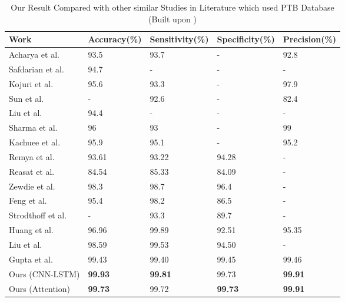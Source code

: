 \documentclass{ieeeaccess}
\begin{document}
\begin{table}[t]
    \centering%
    \caption{Our Result Compared with other similar Studies in Literature which used PTB Database (Built upon \cite{10.1007/978-3-030-64610-3_40})}
    \label{tbl:tbl3}
    \small
    \begin{tabular}{*{5}{p{}}}
          \toprule
    \textbf{Work} &\textbf{Accuracy(\%)} &  \textbf{Sensitivity(\%)} &\textbf{Specificity(\%)} &\textbf{Precision(\%)}
      \\\midrule
    Acharya et al. \cite{ACHARYA2017190} & 93.5 & 93.7 & - & 92.8\\
     Safdarian et al. \cite{safdarain} &94.7 & - & - & -\\
     Kojuri et al. \cite{kojuri}&95.6 & 93.3 & - & 97.9 \\
     Sun et al. \cite{sun} & - & 92.6 & - & 82.4\\
      Liu et al. \cite{Liu94}& 94.4 & - & - & -\\
      Sharma et al. \cite{Sharma2018InferiorMI}& 96 & 93 & - & 99\\
      Kachuee et al. \cite{8419425}& 95.9 & 95.1 & - & 95.2\\
      Remya et al. \cite{remya}& 93.61 & 93.22 & 94.28 & -\\
    Reasat et al. \cite{reasat}& 84.54 & 85.33 & 84.09 & -\\
     Zewdie et al. \cite{zewdie2014fully}& 98.3 & 98.7 & 96.4 & -\\
      Feng et al. \cite{feng}& 95.4 & 98.2 & 86.5 & -\\
      Strodthoff et al. & - & 93.3 & 89.7 & -\\
      Huang et al.& 96.96 & 99.89 & 92.51 & 95.35\\
      Liu et al. \cite{liu} & 98.59 & 99.53 & 94.50 & -\\
     Gupta et al.\cite{10.1007/978-3-030-64610-3_40} & 99.43 & 99.40 & 99.45 & 99.46\\
     Ours (CNN-LSTM)& \textbf{99.93} & \textbf{99.81} & 99.73 & \textbf{99.91}\\
     Ours (Attention) & \textbf{99.73} & 99.72 & \textbf{99.73} & \textbf{99.91}\\    
     \bottomrule
    \end{tabular}
\end{table}
\end{document}

